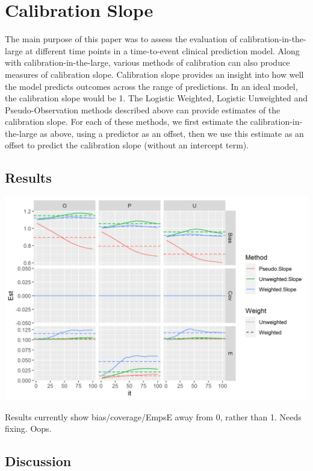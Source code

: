 \documentclass[12pt,PhD,twoside,openright]{muthesis}
\begin{document}
\hypertarget{calibration-slope}{%
\section{Calibration Slope}\label{calibration-slope}}

The main purpose of this paper was to assess the evaluation of calibration-in-the-large at different time points in a time-to-event clinical prediction model. Along with calibration-in-the-large, various methods of calibration can also produce measures of calibration slope. Calibration slope provides an insight into how well the model predicts outcomes across the range of predictions. In an ideal model, the calibration slope would be 1. The Logistic Weighted, Logistic Unweighted and Pseudo-Observation methods described above can provide estimates of the calibration slope. For each of these methods, we first estimate the calibration-in-the-large as above, using a predictor as an offset, then we use this estimate as an offset to predict the calibration slope (without an intercept term).

\hypertarget{results-6}{%
\subsection{Results}\label{results-6}}

\includegraphics[width=29.51in]{figure/IPCW_Logistic/Slope_Plot}

Results currently show bias/coverage/EmpsE away from 0, rather than 1. Needs fixing. Oops.

\hypertarget{discussion-5}{%
\subsection{Discussion}\label{discussion-5}}
\end{document}
